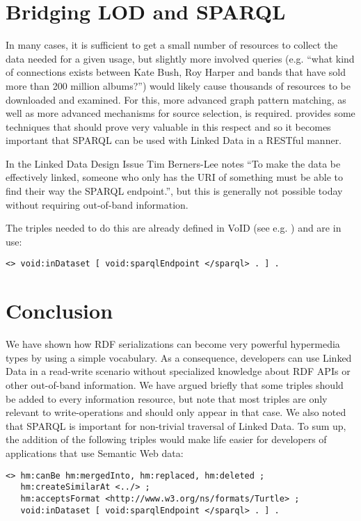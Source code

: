 \documentclass{llncs}
\begin{document}
\section{Bridging LOD and SPARQL}

In many cases, it is sufficient to get a small number of resources to
collect the data needed for a given usage, but slightly more involved
queries (e.g. ``what kind of connections exists between Kate Bush, Roy
Harper and bands that have sold more than 200 million albums?'') would
likely cause thousands of resources to be downloaded and examined. For
this, more advanced graph pattern matching, as well as more advanced
mechanisms for source selection, is
required. \cite{springerlink:10.1007/978-3-642-25073-6-38} provides
some techniques that should prove very valuable in this respect and so
it becomes important that SPARQL can be used with Linked Data in a
RESTful manner.

In the Linked Data Design
Issue\cite{linkeddataissue} Tim
Berners-Lee notes ``To make the data be effectively linked, someone
who only has the URI of something must be able to find their way the
SPARQL endpoint.'', but this is generally not possible today without
requiring out-of-band information.

The triples needed to do this are already defined in
VoID (see e.g. \cite{Alexander09describinglinked}) and are in use:
\begin{verbatim}
<> void:inDataset [ void:sparqlEndpoint </sparql> . ] .
\end{verbatim}

\section{Conclusion}

We have shown how RDF serializations can become very powerful
hypermedia types by using a simple vocabulary. As a consequence,
developers can use Linked Data in a read-write scenario without
specialized knowledge about RDF APIs or other out-of-band
information. We have argued briefly that some triples should be added
to every information resource, but note that most triples are only
relevant to write-operations and should only appear in that case. We
also noted that SPARQL is important for non-trivial traversal of
Linked Data. To sum up, the addition of the following triples would
make life easier for developers of applications that use Semantic Web
data:

\begin{verbatim}
<> hm:canBe hm:mergedInto, hm:replaced, hm:deleted ;
   hm:createSimilarAt <../> ;
   hm:acceptsFormat <http://www.w3.org/ns/formats/Turtle> ;
   void:inDataset [ void:sparqlEndpoint </sparql> . ] .
\end{verbatim}


%
%

\end{document}
